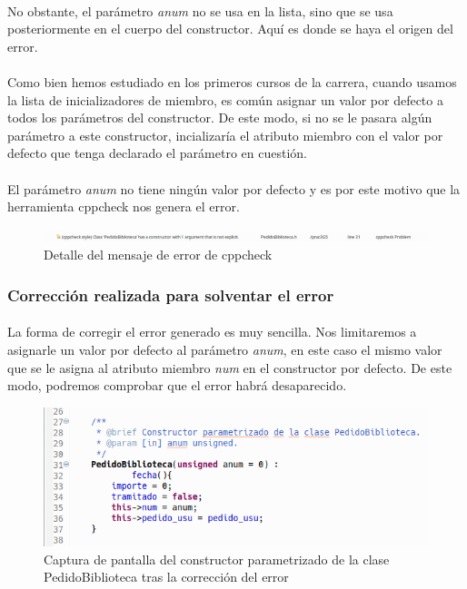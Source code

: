 			\paragraph{}No obstante, el parámetro \textit{anum} no se usa en la lista, sino que se usa posteriormente en el cuerpo del constructor. Aquí es donde se haya el origen del error.
			
			\paragraph{}Como bien hemos estudiado en los primeros cursos de la carrera, cuando usamos la lista de inicializadores de miembro, es común asignar un valor por defecto a todos los parámetros del constructor. De este modo, si no se le pasara algún parámetro a este constructor, incializaría el atributo miembro con el valor por defecto que tenga declarado el parámetro en cuestión.
			
			\paragraph{}El parámetro \textit{anum} no tiene ningún valor por defecto y es por este motivo que la herramienta cppcheck nos genera el error. 
			
			\begin{figure}[H]
				\centering
				\includegraphics[scale=0.38]{img/captura52.png}
				\caption{Detalle del mensaje de error de cppcheck}
				\label{captura52}
			\end{figure}
	
	\subsubsection{Corrección realizada para solventar el error}
	
			\paragraph{}La forma de corregir el error generado es muy sencilla. Nos limitaremos a asignarle un valor por defecto al parámetro \textit{anum}, en este caso el mismo valor que se le asigna al atributo miembro \textit{num} en el constructor por defecto. De este modo, podremos comprobar que el error habrá desaparecido.
			
			\begin{figure}[H]
				\centering
				\includegraphics[scale=0.7]{img/captura53.png}
				\caption{Captura de pantalla del constructor parametrizado de la clase PedidoBiblioteca tras la corrección del error}
				\label{captura53}
			\end{figure}
		
